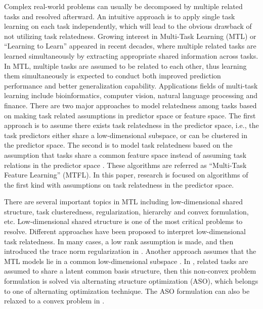\documentclass[twoside,leqno,twocolumn]{article}
\begin{document}
Complex real-world problems can usually be decomposed by multiple related tasks and resolved afterward.
An intuitive approach is to apply single task learning on each task independently,
which will lead to the obvious drawback of not utilizing task relatedness.
Growing interest in Multi-Task
Learning (MTL) or ``Learning to Learn'' appeared in recent decades, where  multiple
related tasks are learned simultaneously by extracting appropriate shared information
across tasks. In MTL, multiple tasks are assumed to be related to
each other, thus learning them simultaneously is expected to
conduct both improved prediction performance and better generalization
capability. Applications fields of multi-task learning include bioinformatics,
computer vision, natural language processing and finance. There are
two major approaches to model relatedness among tasks based on making
task related assumptions in predictor space or feature space.
The first approach is to assume there exists task relatedness in the predictor
space, i.e., the task predictors either share a low-dimensional subspace,
or can be clustered in the predictor space. The second is to model task
relatedness based on the assumption that tasks share a common feature
space instead of assuming task relations in the predictor space \cite{mtl:aso:ando2005framework,mtl:mlj2008:argyriou2008convex}.
These algorithms are referred as ``Multi-Task Feature Learning''
(MTFL). In this paper, research is focused on algorithms of the first kind with assumptions 
on task relatedness in the predictor space. 

There are several important topics in MTL including low-dimensional
shared structure, task clusteredness, regularization, hierarchy and convex formulation, etc. Low-dimensional
shared structure is one of the most critical problems to resolve. Different approaches have been proposed to interpret low-dimensional
task relatedness. In many cases, a low rank assumption is made, and then introduced the trace norm regularization in \cite{ji2009accelerated,mtl:siam2010:pong2010trace}. Another
approach assumes that the MTL models lie in a common low-dimensional
subspace \cite{mtl:icml2009:chen2009convex,mtl:NIPS2012:zhang,mtl:aso:ando2005framework}.
In \cite{mtl:aso:ando2005framework}, related tasks are assumed
to share a latent common basis structure, then this non-convex problem
formulation is solved via alternating structure optimization (ASO),
which belongs to one of alternating optimization technique.
The ASO formulation can also be relaxed to a convex problem in \cite{mtl:icml2009:chen2009convex}. 
\end{document}
